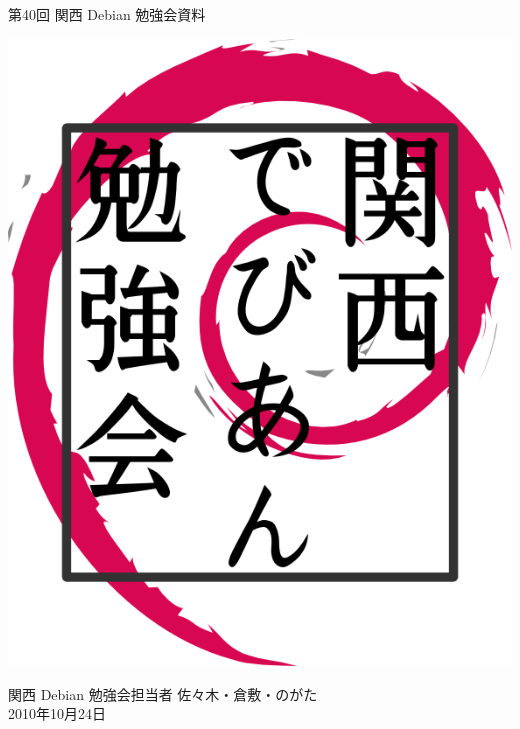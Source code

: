 \documentclass[mingoth,a4paper]{jsarticle}
\newcommand{\debmtgyear}{2010}
\newcommand{\debmtgdate}{24}
\newcommand{\debmtgmonth}{10}
\newcommand{\debmtgnumber}{40}
\begin{document}
\begin{titlepage}


 第\debmtgnumber{}回 関西 Debian 勉強会資料

\vspace{2cm}

\begin{center}
\includegraphics{image200802/kansaidebianlogo.png}
\end{center}

\begin{flushright}
\hfill{}関西 Debian 勉強会担当者 佐々木・倉敷・のがた \\
\hfill{}\debmtgyear{}年\debmtgmonth{}月\debmtgdate{}日
\end{flushright}

\thispagestyle{empty}
\end{titlepage}


\subsection*{}%
\end{document}
